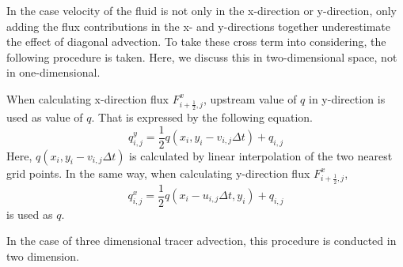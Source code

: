 In the case velocity of the fluid is not only in the x-direction or y-direction, only adding the flux contributions in the x- and y-directions together underestimate the effect of diagonal advection.
To take these cross term into considering, the following procedure is taken.
Here, we discuss this in two-dimensional space, not in one-dimensional.

When calculating x-direction flux $F^{x}_{i+\frac{1}{2},j}$, upstream value of $q$ in y-direction is used as value of $q$.
That is expressed by the following equation.
  \begin{equation}
    q^{y}_{i,j}=\frac{1}{2} {q(x_{i},y_{i}-v_{i,j}\Delta t)+q_{i,j}}
  \end{equation}
Here, $q(x_{i},y_{i}-v_{i,j}\Delta t)$ is calculated by linear interpolation of the two nearest grid points.
In the same way, when calculating y-direction flux $F^{x}_{i+\frac{1}{2},j}$,
  \begin{equation}
    q^{x}_{i,j}=\frac{1}{2} {q(x_{i}-u_{i,j}\Delta t,y_{i})+q_{i,j}}
  \end{equation}
  is used as $q$.

  In the case of three dimensional tracer advection, this procedure is conducted in two dimension.

